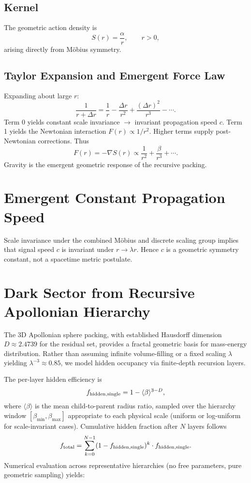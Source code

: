 \documentclass[11pt,a4paper]{article}
\begin{document}
\subsection{Kernel}
The geometric action density is
\[
S(r)=\frac{\alpha}{r},\qquad r>0,
\]
arising directly from M\"obius symmetry.

\subsection{Taylor Expansion and Emergent Force Law}
Expanding about large $r$:
\[
\frac{1}{r+\Delta r}=\frac{1}{r}-\frac{\Delta r}{r^2}+\frac{(\Delta r)^2}{r^3}-\cdots.
\]
Term 0 yields constant scale invariance $\to$ invariant propagation speed $c$.
Term 1 yields the Newtonian interaction $F(r)\propto 1/r^2$.
Higher terms supply post-Newtonian corrections. Thus
\[
F(r)=-\nabla S(r)\propto\frac{1}{r^2}+\frac{\beta}{r^3}+\cdots.
\]
Gravity is the emergent geometric response of the recursive packing.

\section{Emergent Constant Propagation Speed}
Scale invariance under the combined M\"obius and discrete scaling group implies that signal speed $c$ is invariant under $r\to\lambda r$. Hence $c$ is a geometric symmetry constant, not a spacetime metric postulate.

\section{Dark Sector from Recursive Apollonian Hierarchy}
The 3D Apollonian sphere packing, with established Hausdorff dimension $D \approx 2.4739$ for the residual set, provides a fractal geometric basis for mass-energy distribution. Rather than assuming infinite volume-filling or a fixed scaling $\lambda$ yielding $\lambda^{-3} \approx 0.85$, we model hidden occupancy via finite-depth recursion layers.

The per-layer hidden efficiency is
\[
f_{\rm hidden, single} = 1 - \langle \beta \rangle^{3-D},
\]
where $\langle \beta \rangle$ is the mean child-to-parent radius ratio, sampled over the hierarchy window $[\beta_{\min}, \beta_{\max}]$ appropriate to each physical scale (uniform or log-uniform for scale-invariant cases). Cumulative hidden fraction after $N$ layers follows
\[
f_{\rm total} = \sum_{k=0}^{N-1} (1 - f_{\rm hidden, single})^k \cdot f_{\rm hidden, single}.
\]
Numerical evaluation across representative hierarchies (no free parameters, pure geometric sampling) yields:
\end{document}
